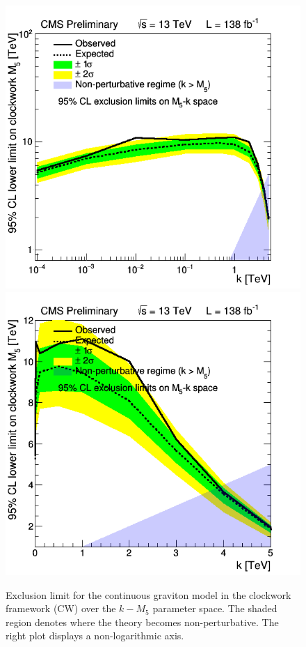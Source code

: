 \begin{figure}[h!]
    \centering
    \includegraphics[width=0.49\linewidth]{fig/LIMITPLOT_BBBE161718_CWk_real.png}
    \includegraphics[width=0.47\linewidth]{fig/LIMITPLOT_BBBE161718_CWk_nonLog_real.png}
    \caption{Exclusion limit for the continuous graviton model in the clockwork framework (CW) over the $k-M_5$ parameter space. The shaded region denotes where the theory becomes non-perturbative. The right plot displays a non-logarithmic axis.}
    \label{Fig:LIMIT_Clockwork_real}
\end{figure}


